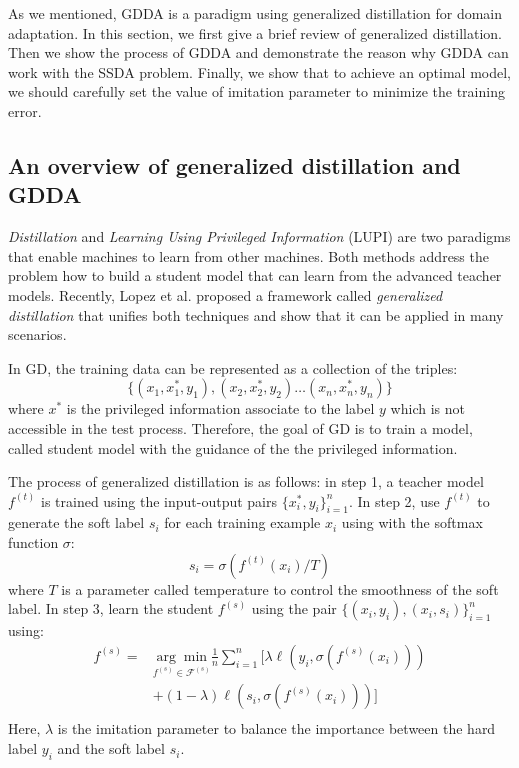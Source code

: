 As we mentioned, GDDA is a paradigm using generalized distillation for domain adaptation. In this section, we first give a brief review of generalized distillation. Then we show the process of GDDA and demonstrate the reason why GDDA can work with the SSDA problem. Finally, we show that to achieve an optimal model, we should carefully set the value of imitation parameter to minimize the training error. 
\subsection{An overview of generalized distillation and GDDA}
\textit{Distillation} \cite{hinton2015distilling} and \textit{Learning Using Privileged Information} (LUPI) \cite{vapnik2015learning} are two paradigms that enable machines to learn from other machines. Both methods address the problem how to build a student model that can learn from the advanced teacher models. Recently, Lopez {et al.} \cite{lopez2015unifying} proposed a framework called \textit{generalized distillation} that unifies both techniques and show that it can be applied in many scenarios.

In GD, the training data can be represented as a collection of the triples:
\[\{\left(x_1,x_1^*,y_1\right),\left(x_2,x_2^*,y_2\right) \dots \left(x_n,x_n^*,y_n\right)\}\]
where $x^*$ is the privileged information associate to the label $y$ which is not accessible in the test process. Therefore, the goal of GD is to train a model, called student model with the guidance of the the privileged information.

The process of generalized distillation is as follows: in step 1, a teacher model ${f}^{(t)}$ is trained using the input-output pairs $\{x^*_i,y_i\}_{i=1}^n$. In step 2, use ${f}^{(t)}$ to generate the soft label $s_i$ for each training example $x_i$ using with the softmax function $\sigma$:
\begin{equation}\label{eq:softmax_T}
s_i=\sigma(f^{(t)}(x_i)/T)
\end{equation}
where $T$ is a parameter called temperature to control the smoothness of the soft label. In step 3, learn the student ${f}^{(s)}$ using the pair $\{\left(x_i,y_i\right),\left(x_i,s_i\right)\}_{i=1}^n$ using:
\begin{equation}\label{eq:distill}
\begin{aligned}
f^{(s)}=&\underset{f^{(s)} \in \mathcal{F}^{(s)}}{\arg \min}\frac{1}{n}\sum_{i=1}^{n}[\lambda\ell\left(y_i,\sigma(f^{(s)}(x_i))\right)\\
&+(1-\lambda)\ell\left(s_i,\sigma(f^{(s)}(x_i))\right)]\\
\end{aligned}
\end{equation}
Here, $\lambda$ is the imitation parameter to balance the importance between the hard label $y_i$ and the soft label $s_i$.

